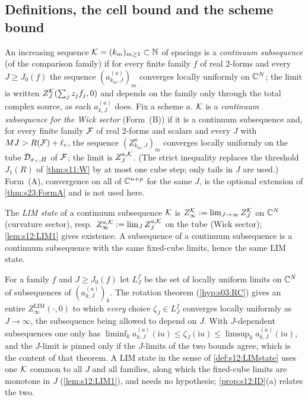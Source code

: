 \subsection{Definitions, the cell bound and the scheme bound}

\begin{definition}\label{def:s12:contsub}
An increasing sequence $\mathcal K=(k_m)_{m\ge1}\subset\mathbb N$ of spacings is a \emph{continuum subsequence} (of the comparison family) if for every finite family $f$ of real $2$-forms and every $J\ge J_0(f)$ the sequence $(a^{(a)}_{k_m,J})_m$ converges locally uniformly on $\mathbb C^N$; the limit is written $Z^{\mathcal K}_J(\sum_jz_jf_j,0)$ and depends on the family only through the total complex source, as each $a^{(a)}_{k,J}$ does. Fix a scheme $a$. $\mathcal K$ is a \emph{continuum subsequence for the Wick sector} (Form~(B)) if it is a continuum subsequence and, for every finite family $\mathcal F$ of real $2$-forms and scalars and every $J$ with $MJ>R(\mathcal F)+\ell_c$, the sequence $(Z^a_{k_m,J})_m$ converges locally uniformly on the tube $\mathcal D_{\sigma_+,H}$ of $\mathcal F$; the limit is $Z^{a,\mathcal K}_J$. (The strict inequality replaces the threshold $J_1(R)$ of \cref{thm:s11:W} by at most one cube step; only tails in $J$ are used.) Form~(A), convergence on all of $\mathbb C^{n+p}$ for the same $J$, is the optional extension of \cref{thm:s23:FormA} and is not used here.
\end{definition}

\begin{definition}\label{def:s12:LIMstate}
The \emph{LIM state} of a continuum subsequence $\mathcal K$ is $Z^{\mathcal K}_{\infty}:=\lim_{J\to\infty}Z^{\mathcal K}_J$ on $\mathbb C^N$ (curvature sector), resp.\ $Z^{a,\mathcal K}_\infty:=\lim_JZ^{a,\mathcal K}_J$ on the tube (Wick sector); \cref{lem:s12:LIM1} gives existence. A subsequence of a continuum subsequence is a continuum subsequence with the same fixed-cube limits, hence the same LIM state.
\end{definition}

\begin{definition}\label{def:s12:o3LIM}
For a family $f$ and $J\ge J_0(f)$ let $L^f_J$ be the set of locally uniform limits on $\mathbb C^N$ of subsequences of $(a^{(a)}_{k,J})_k$. The rotation theorem (\cref{hyp:s03:RC}) gives an entire $Z^{\mathrm{LIM}}_\infty(\cdot,0)$ to which \emph{every} choice $\zeta_J\in L^f_J$ converges locally uniformly as $J\to\infty$, the subsequence being allowed to depend on $J$. With $J$-dependent subsequences one only has $\liminf_ka^{(a)}_{k,J}(\mathrm iu)\le\zeta_J(\mathrm iu)\le\limsup_ka^{(a)}_{k,J}(\mathrm iu)$, and the $J$-limit is pinned only if the $J$-limits of the two bounds agree, which is the content of that theorem. A LIM state in the sense of \cref{def:s12:LIMstate} uses one $\mathcal K$ common to all $J$ and all families, along which the fixed-cube limits are monotone in $J$ (\cref{lem:s12:LIM1}), and needs no hypothesis; \cref{prop:s12:ID}(a) relates the two.
\end{definition}

